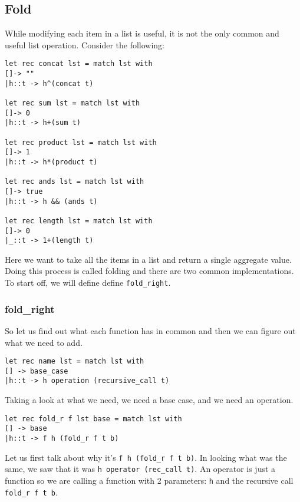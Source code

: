 \documentclass[main.tex]{subfiles}
\begin{document}
\subsection{Fold}
While modifying each item in a list is useful, it is not the only common and useful list operation. Consider the following:
\begin{lstlisting}[style=Myocamlstyle]
let rec concat lst = match lst with 
[]-> ""
|h::t -> h^(concat t)
 
let rec sum lst = match lst with 
[]-> 0
|h::t -> h+(sum t)
 
let rec product lst = match lst with 
[]-> 1
|h::t -> h*(product t)
 
let rec ands lst = match lst with
[]-> true
|h::t -> h && (ands t)

let rec length lst = match lst with 
[]-> 0
|_::t -> 1+(length t)
\end{lstlisting}
Here we want to take all the items in a list and return a single aggregate value. Doing this process is called folding and there are two common implementations. To start off, we will define define \texttt{fold\_right}. 

\subsubsection{fold\_right}
So let us find out what each function has in common and then we can figure out what we need to add. 
\begin{lstlisting}[style=Myocamlstyle]
let rec name lst = match lst with 
[] -> base_case
|h::t -> h operation (recursive_call t)
\end{lstlisting}
Taking a look at what we need, we need a base case, and we need an operation. 
\begin{lstlisting}[style=Myocamlstyle]
let rec fold_r f lst base = match lst with 
[] -> base
|h::t -> f h (fold_r f t b)
\end{lstlisting}
Let us first talk about why it's \texttt{f h (fold\_r f t b)}. 
In looking what was the same, we saw that it was \texttt{h operator (rec\_call t)}. An operator is just a function so 
we are calling a function with 2 parameters: \texttt{h} and the recursive call \texttt{fold\_r f t b}. 
\end{document}
